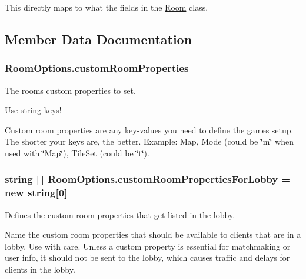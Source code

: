 This directly maps to what the fields in the \hyperlink{class_room}{Room} class.

\subsection{Member Data Documentation}
\subsubsection[{\texorpdfstring{custom\+Room\+Properties}{customRoomProperties}}]{ Room\+Options.\+custom\+Room\+Properties}\hypertarget{class_room_options_a0bc17f8465ed615ce0126674af329a1f}{}\label{class_room_options_a0bc17f8465ed615ce0126674af329a1f}


The room\textquotesingle{}s custom properties to set. 

Use string keys!

Custom room properties are any key-\/values you need to define the game\textquotesingle{}s setup. The shorter your keys are, the better. Example\+: Map, Mode (could be \char`\"{}m\char`\"{} when used with \char`\"{}\+Map\char`\"{}), Tile\+Set (could be \char`\"{}t\char`\"{}). 
\subsubsection[{\texorpdfstring{custom\+Room\+Properties\+For\+Lobby}{customRoomPropertiesForLobby}}]{\setlength{\rightskip}{0pt plus 5cm}string \mbox{[}$\,$\mbox{]} Room\+Options.\+custom\+Room\+Properties\+For\+Lobby = new string\mbox{[}0\mbox{]}}\hypertarget{class_room_options_a8c4bca19c674840296f924ec701b9ee1}{}\label{class_room_options_a8c4bca19c674840296f924ec701b9ee1}


Defines the custom room properties that get listed in the lobby. 

Name the custom room properties that should be available to clients that are in a lobby. Use with care. Unless a custom property is essential for matchmaking or user info, it should not be sent to the lobby, which causes traffic and delays for clients in the lobby.

